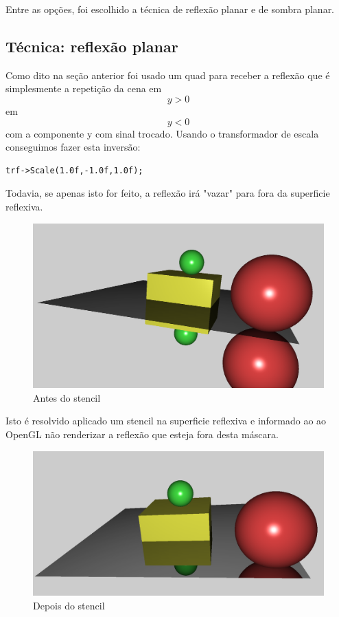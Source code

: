 \documentclass[11pt, a4paper]{article}
\begin{document}
Entre as opções, foi escolhido a técnica de reflexão planar e de sombra planar.

\subsection {Técnica: reflexão planar}

Como dito na seção anterior foi usado um quad para receber a reflexão que é 
simplesmente a repetição da cena em $$y > 0$$ em $$y < 0$$ com a componente y
com sinal trocado. Usando o transformador de escala conseguimos fazer esta 
inversão:

\begin{verbatim}
trf->Scale(1.0f,-1.0f,1.0f);
\end{verbatim}

Todavia, se apenas isto for feito, a reflexão irá "vazar" para fora da superficie
reflexiva.

\begin{figure}[H]
  \begin{center}
  \includegraphics[width=0.8\linewidth]{before-stencil.png}
  \caption{Antes do stencil}
  \label{fig:vaz}
  \end{center}
\end{figure}

Isto é resolvido aplicado um stencil na superficie reflexiva e informado ao 
ao OpenGL não renderizar a reflexão que esteja fora desta máscara.

\begin{figure}[H]
  \begin{center}
  \includegraphics[width=0.8\linewidth]{after-stencil.png}
  \caption{Depois do stencil}
  \label{fig:vaz}
  \end{center}
\end{figure}
\end{document}
